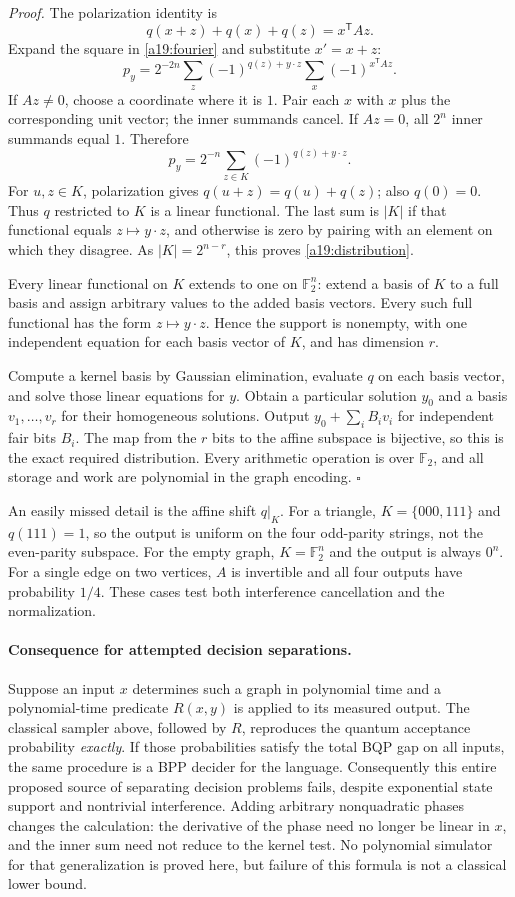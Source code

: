 \documentclass[11pt]{article}
\begin{document}
\emph{Proof.} The polarization identity is
\[
                   q(x+z)+q(x)+q(z)=x^{\mathsf T}Az.
\]
Expand the square in \eqref{a19:fourier} and substitute $x'=x+z$:
\[
 p_y=2^{-2n}\sum_z(-1)^{q(z)+y\cdot z}
                   \sum_x(-1)^{x^{\mathsf T}Az}.
\]
If $Az\ne0$, choose a coordinate where it is $1$. Pair each $x$ with $x$
plus the corresponding unit vector; the inner summands cancel. If $Az=0$,
all $2^n$ inner summands equal $1$. Therefore
\[
                 p_y=2^{-n}\sum_{z\in K}(-1)^{q(z)+y\cdot z}.
\]
For $u,z\in K$, polarization gives $q(u+z)=q(u)+q(z)$; also $q(0)=0$.
Thus $q$ restricted to $K$ is a linear functional. The last sum is $|K|$
if that functional equals $z\mapsto y\cdot z$, and otherwise is zero by
pairing with an element on which they disagree. As $|K|=2^{n-r}$, this
proves \eqref{a19:distribution}.

Every linear functional on $K$ extends to one on $\mathbb F_2^n$: extend
a basis of $K$ to a full basis and assign arbitrary values to the added
basis vectors. Every such full functional has the form $z\mapsto y\cdot z$.
Hence the support is nonempty, with one independent equation for each basis
vector of $K$, and has dimension $r$.

Compute a kernel basis by Gaussian elimination, evaluate $q$ on each basis
vector, and solve those linear equations for $y$. Obtain a particular
solution $y_0$ and a basis $v_1,\ldots,v_r$ for their homogeneous solutions.
Output $y_0+\sum_i B_i v_i$ for independent fair bits $B_i$. The map from
the $r$ bits to the affine subspace is bijective, so this is the exact
required distribution. Every arithmetic operation is over $\mathbb F_2$,
and all storage and work are polynomial in the graph encoding.
\hfill$\square$

An easily missed detail is the affine shift $q|_K$. For a triangle,
$K=\{000,111\}$ and $q(111)=1$, so the output is uniform on the four
odd-parity strings, not the even-parity subspace. For the empty graph,
$K=\mathbb F_2^n$ and the output is always $0^n$. For a single edge on
two vertices, $A$ is invertible and all four outputs have probability $1/4$.
These cases test both interference cancellation and the normalization.

\paragraph{Consequence for attempted decision separations.}
Suppose an input $x$ determines such a graph in polynomial time and a
polynomial-time predicate $R(x,y)$ is applied to its measured output. The
classical sampler above, followed by $R$, reproduces the quantum acceptance
probability \emph{exactly}. If those probabilities satisfy the total BQP
gap on all inputs, the same procedure is a BPP decider for the language.
Consequently this entire proposed source of separating decision problems
fails, despite exponential state support and nontrivial interference.
Adding arbitrary nonquadratic phases changes the calculation: the derivative
of the phase need no longer be linear in $x$, and the inner sum need not
reduce to the kernel test. No polynomial simulator for that generalization
is proved here, but failure of this formula is not a classical lower bound.
\end{document}
